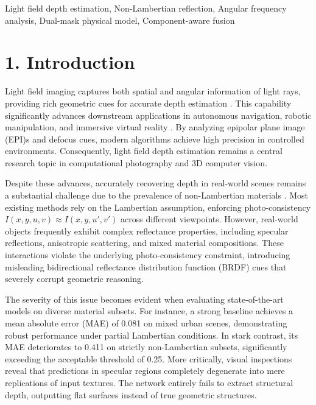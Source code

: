 \documentclass[lettersize,journal]{IEEEtran}
\begin{document}
\begin{IEEEkeywords}
Light field depth estimation, Non-Lambertian reflection, Angular frequency analysis, Dual-mask physical model, Component-aware fusion
\end{IEEEkeywords}

\section{1. Introduction}

Light field imaging captures both spatial and angular information of light rays, providing rich geometric cues for accurate depth estimation \cite{lightlight}. This capability significantly advances downstream applications in autonomous navigation, robotic manipulation, and immersive virtual reality \cite{autonomous}. By analyzing epipolar plane image (EPI)s and defocus cues, modern algorithms achieve high precision in controlled environments. Consequently, light field depth estimation remains a central research topic in computational photography and 3D computer vision.

Despite these advances, accurately recovering depth in real-world scenes remains a substantial challenge due to the prevalence of non-Lambertian materials \cite{nonnon}. Most existing methods rely on the Lambertian assumption, enforcing photo-consistency $I(x, y, u, v) \approx I(x, y, u', v')$ across different viewpoints. However, real-world objects frequently exhibit complex reflectance properties, including specular reflections, anisotropic scattering, and mixed material compositions. These interactions violate the underlying photo-consistency constraint, introducing misleading bidirectional reflectance distribution function (BRDF) cues that severely corrupt geometric reasoning.

The severity of this issue becomes evident when evaluating state-of-the-art models on diverse material subsets. For instance, a strong baseline achieves a mean absolute error (MAE) of 0.081 on mixed urban scenes, demonstrating robust performance under partial Lambertian conditions. In stark contrast, its MAE deteriorates to 0.411 on strictly non-Lambertian subsets, significantly exceeding the acceptable threshold of 0.25. More critically, visual inspections reveal that predictions in specular regions completely degenerate into mere replications of input textures. The network entirely fails to extract structural depth, outputting flat surfaces instead of true geometric structures.
\end{document}

